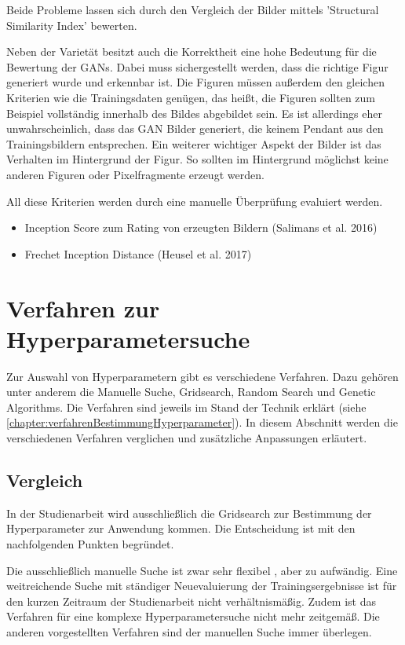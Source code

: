 Beide Probleme lassen sich durch den Vergleich der Bilder mittels 'Structural Similarity Index' \cite{structural-similarity-index} bewerten.

Neben der Varietät besitzt auch die Korrektheit eine hohe Bedeutung für die Bewertung der GANs.
Dabei muss sichergestellt werden, dass die richtige Figur generiert wurde und erkennbar ist.
Die Figuren müssen außerdem den gleichen Kriterien wie die Trainingsdaten genügen, das heißt, die Figuren sollten zum Beispiel vollständig innerhalb des Bildes abgebildet sein.
Es ist allerdings eher unwahrscheinlich, dass das GAN Bilder generiert, die keinem Pendant aus den Trainingsbildern entsprechen.
Ein weiterer wichtiger Aspekt der Bilder ist das Verhalten im Hintergrund der Figur.
So sollten im Hintergrund möglichst keine anderen Figuren oder Pixelfragmente erzeugt werden.

All diese Kriterien werden durch eine manuelle Überprüfung evaluiert werden.

\begin{itemize}
	\item Inception Score zum Rating von erzeugten Bildern (Salimans et al. 2016)
	\item Frechet Inception Distance (Heusel et al. 2017)
\end{itemize}

\section{Verfahren zur Hyperparametersuche}
Zur Auswahl von Hyperparametern gibt es verschiedene Verfahren.
Dazu gehören unter anderem die Manuelle Suche, Gridsearch, Random Search und Genetic Algorithms.
Die Verfahren sind jeweils im Stand der Technik erklärt (siehe \cref{chapter:verfahrenBestimmungHyperparameter}).
In diesem Abschnitt werden die verschiedenen Verfahren verglichen und zusätzliche Anpassungen erläutert.

\subsection{Vergleich}
In der Studienarbeit wird ausschließlich die Gridsearch zur Bestimmung der Hyperparameter zur Anwendung kommen.
Die Entscheidung ist mit den nachfolgenden Punkten begründet.

Die ausschließlich manuelle Suche ist zwar sehr flexibel , aber zu aufwändig.
Eine weitreichende Suche mit ständiger Neuevaluierung der Trainingsergebnisse ist für den kurzen Zeitraum der Studienarbeit nicht verhältnismäßig.
Zudem ist das Verfahren für eine komplexe Hyperparametersuche nicht mehr zeitgemäß.
Die anderen vorgestellten Verfahren sind der manuellen Suche immer überlegen.

